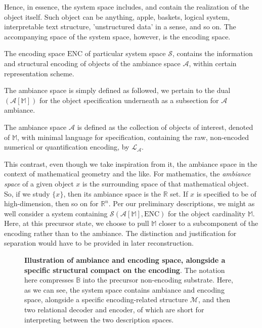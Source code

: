 Hence, in essence, the system space includes, and contain the realization of the object itself. Such object can be anything, apple, baskets, logical system, interpretable text structure, 'unstructured data' in a sense, and so on. The accompanying space of the system space, however, is the encoding space. 
\begin{definition}
    The encoding space $\mathrm{ENC}$ of particular system space $\mathcal{S}$, contains the information and structural encoding of objects of the ambiance space $\mathcal{A}$, within certain representation scheme. 
\end{definition}
The ambiance space is simply defined as followed, we pertain to the dual $(\mathcal{A}[\mathbb{M}])$ for the object specification underneath as a subsection for $\mathcal{A}$ ambiance. 
\begin{definition}
    The ambiance space $\mathcal{A}$ is defined as the collection of objects of interest, denoted of $\mathbb{M}$, with minimal language for specification, containing the raw, non-encoded numerical or quantification encoding, by $\mathcal{L}_{\mathcal{A}}$.  
\end{definition}
This contrast, even though we take inspiration from it, the ambiance space in the context of mathematical geometry and the like. For mathematics, the \textit{ambiance space} of a given object $x$ is the surrounding space of that mathematical object. So, if we study $\{x\}$, then its ambiance space is the $\mathbb{R}$ set. If $x$ is specified to be of high-dimension, then so on for $\mathbb{R}^n$. Per our preliminary descriptions, we might as well consider a system containing $\mathcal{S}(\mathcal{A}[\mathbb{M}],\mathrm{ENC})$ for the object cardinality $\mathbb{M}$. Here, at this precursor state, we choose to pull $\mathbb{M}$ closer to a subcomponent of the encoding rather than to the ambiance. The distinction and justification for separation would have to be provided in later reconstruction. 
\begin{figure}[htb]
	\centering
	\caption{\textbf{Illustration of ambiance and encoding space, alongside a specific structural compact on the encoding}. The notation here compresses $\mathbb{B}$ into the precursor non-encoding substrate. Here, as we can see, the system space contains ambiance and encoding space, alongside a specific encoding-related structure $\mathcal{M}$, and then two relational decoder and encoder, of which are short for interpreting between the two description spaces.}
\end{figure}

